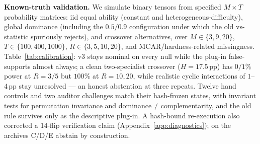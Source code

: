 \textbf{Known-truth validation.}\label{sec:calibration}
We simulate binary tensors from specified $M\times T$ probability
matrices: iid equal ability (constant and heterogeneous-difficulty),
global dominance (including the $0.5/0.9$ configuration under which the
old vs-\bare{} statistic spuriously rejects), and crossover
alternatives, over $M\in\{3,9,20\}$, $T\in\{100,400,1000\}$,
$R\in\{3,5,10,20\}$, and MCAR/hardness-related missingness.
Table~\ref{tab:calibration}: v3 stays nominal on every null while the
plug-in false-supports almost always; a clean two-specialist crossover
($H{=}17.5$\,pp) has $0/1\%$ power at $R{=}3/5$ but $100\%$ at
$R{=}10,20$, while realistic cyclic interactions of $1$--$4$\,pp stay
unresolved --- an honest abstention at three repeats. Twelve
hand controls and two auditor challenges match their hash-frozen
states, with invariant tests for permutation invariance and
dominance$\ne$complementarity, and the old rule survives only as the
descriptive plug-in. A hash-bound re-execution also corrected a 14-flip
verification claim (Appendix~\ref{app:diagnostics}); on the archives
C/D/E abstain by construction.

\begin{table}[h]
\centering\small

\caption{\textbf{Known-truth calibration at $M{=}9,T{=}400$.}
Nulls: false-support \% (nominal 5\%); alternatives: power; full grid in
Appendix~\ref{app:diagnostics}.}
\label{tab:calibration}
\end{table}
